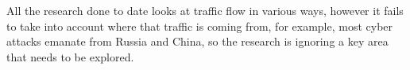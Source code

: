 All the research done to date looks at traffic flow in various ways, however it fails to take into account where that traffic is coming from, for example, most cyber attacks emanate from Russia and China, so the research is ignoring a key area that needs to be explored.




